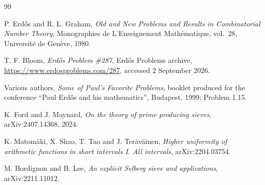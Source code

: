 \documentclass[11pt]{article}
\theoremstyle{definition}
\newcommand{\1}{\mathbf 1}
\begin{document}
\begin{thebibliography}{99}

P. Erd\H{o}s and R. L. Graham,
\emph{Old and New Problems and Results in Combinatorial Number Theory},
Monographies de L'Enseignement Math\'ematique, vol.~28, Universit\'e de Gen\`eve, 1980.

T. F. Bloom,
\emph{Erd\H{o}s Problem \#287},
Erd\H{o}s Problems archive,
\url{https://www.erdosproblems.com/287}, accessed 2 September 2026.

Various authors,
\emph{Some of Paul's Favorite Problems},
booklet produced for the conference ``Paul Erd\H{o}s and his mathematics'', Budapest, 1999; Problem 1.15.

K. Ford and J. Maynard,
\emph{On the theory of prime producing sieves},
arXiv:2407.14368, 2024.

K. Matom\"aki, X. Shao, T. Tao and J. Ter\"av\"ainen,
\emph{Higher uniformity of arithmetic functions in short intervals I. All intervals},
arXiv:2204.03754.

M. Bordignon and B. Lee,
\emph{An explicit Selberg sieve and applications},
arXiv:2211.11012.

\end{thebibliography}
\end{document}
